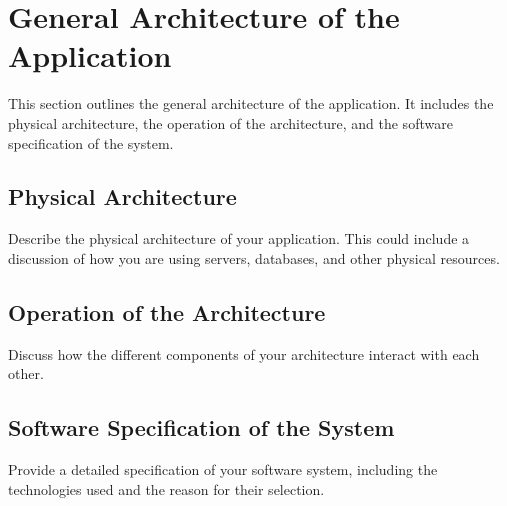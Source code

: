 \section{General Architecture of the Application}

This section outlines the general architecture of the application. It includes the physical architecture, the operation of the architecture, and the software specification of the system.

\subsection{Physical Architecture}
Describe the physical architecture of your application. This could include a discussion of how you are using servers, databases, and other physical resources.

\subsection{Operation of the Architecture}
Discuss how the different components of your architecture interact with each other.

\subsection{Software Specification of the System}
Provide a detailed specification of your software system, including the technologies used and the reason for their selection.

